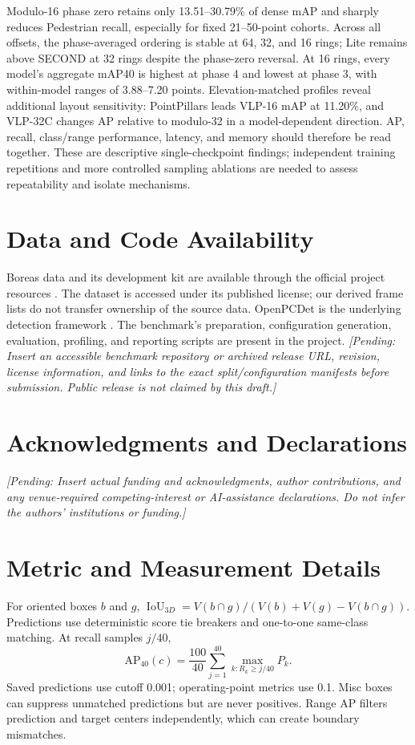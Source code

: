 \documentclass[10pt,twocolumn]{article}
\newcommand{\pending}[1]{\textcolor{blue!55!black}{\textit{[Pending: #1]}}}
\begin{document}
Modulo-16 phase zero retains only 13.51--30.79\% of dense mAP and sharply reduces Pedestrian recall, especially for fixed 21--50-point cohorts. Across all offsets, the phase-averaged ordering is stable at 64, 32, and 16 rings; Lite remains above SECOND at 32 rings despite the phase-zero reversal. At 16 rings, every model's aggregate mAP40 is highest at phase 4 and lowest at phase 3, with within-model ranges of 3.88--7.20 points. Elevation-matched profiles reveal additional layout sensitivity: PointPillars leads VLP-16 mAP at 11.20\%, and VLP-32C changes AP relative to modulo-32 in a model-dependent direction. AP, recall, class/range performance, latency, and memory should therefore be read together. These are descriptive single-checkpoint findings; independent training repetitions and more controlled sampling ablations are needed to assess repeatability and isolate mechanisms.

\section*{Data and Code Availability}
Boreas data and its development kit are available through the official project resources \cite{boreas_site,boreas_aws,pyboreas}. The dataset is accessed under its published license; our derived frame lists do not transfer ownership of the source data. OpenPCDet is the underlying detection framework \cite{openpcdet2020}. The benchmark's preparation, configuration generation, evaluation, profiling, and reporting scripts are present in the project. \pending{Insert an accessible benchmark repository or archived release URL, revision, license information, and links to the exact split/configuration manifests before submission. Public release is not claimed by this draft.}

\section*{Acknowledgments and Declarations}
\pending{Insert actual funding and acknowledgments, author contributions, and any venue-required competing-interest or AI-assistance declarations. Do not infer the authors' institutions or funding.}

\appendix
\section{Metric and Measurement Details}
\label{app:metrics}
For oriented boxes $b$ and $g$, $\operatorname{IoU}_{3D}=V(b\cap g)/(V(b)+V(g)-V(b\cap g))$. Predictions use deterministic score tie breakers and one-to-one same-class matching. At recall samples $j/40$,
\begin{equation}
\mathrm{AP}_{40}(c)=\frac{100}{40}\sum_{j=1}^{40}\max_{k:R_k\ge j/40}P_k.
\end{equation}
Saved predictions use cutoff 0.001; operating-point metrics use 0.1. Misc boxes can suppress unmatched predictions but are never positives. Range AP filters prediction and target centers independently, which can create boundary mismatches.
\end{document}
